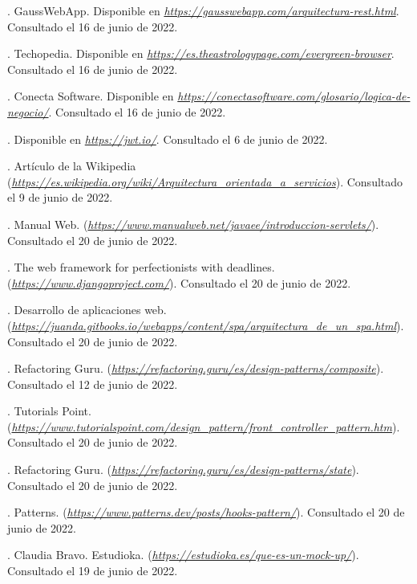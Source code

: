 \begin{thebibliography}{99}
. GaussWebApp. Disponible en {\it \url{https://gausswebapp.com/arquitectura-rest.html}}. Consultado el 16 de junio de 2022.

. Techopedia. Disponible en {\it \url{https://es.theastrologypage.com/evergreen-browser}}. Consultado el 16 de junio de 2022.

. Conecta Software. Disponible en {\it \url{https://conectasoftware.com/glosario/logica-de-negocio/}}. Consultado el 16 de junio de 2022.

. Disponible en {\it \url{https://jwt.io/}}. Consultado el 6 de junio de 2022.

. Artículo de la Wikipedia ({\it \url{https://es.wikipedia.org/wiki/Arquitectura_orientada_a_servicios}}). Consultado el 9 de junio de 2022.

. Manual Web. ({\it \url{https://www.manualweb.net/javaee/introduccion-servlets/}}). Consultado el 20 de junio de 2022.

. The web framework for perfectionists with deadlines. ({\it \url{https://www.djangoproject.com/}}). Consultado el 20 de junio de 2022.

. Desarrollo de aplicaciones web. ({\it \url{https://juanda.gitbooks.io/webapps/content/spa/arquitectura_de_un_spa.html}}). Consultado el 20 de junio de 2022.

. Refactoring Guru. ({\it \url{https://refactoring.guru/es/design-patterns/composite}}). Consultado el 12 de junio de 2022.

. Tutorials Point. ({\it \url{https://www.tutorialspoint.com/design_pattern/front_controller_pattern.htm}}). Consultado el 20 de junio de 2022.

. Refactoring Guru. ({\it \url{https://refactoring.guru/es/design-patterns/state}}). Consultado el 20 de junio de 2022.

. Patterns. ({\it \url{https://www.patterns.dev/posts/hooks-pattern/}}). Consultado el 20 de junio de 2022.

. Claudia Bravo. Estudioka. ({\it \url{https://estudioka.es/que-es-un-mock-up/}}). Consultado el 19 de junio de 2022.


\end{thebibliography}
